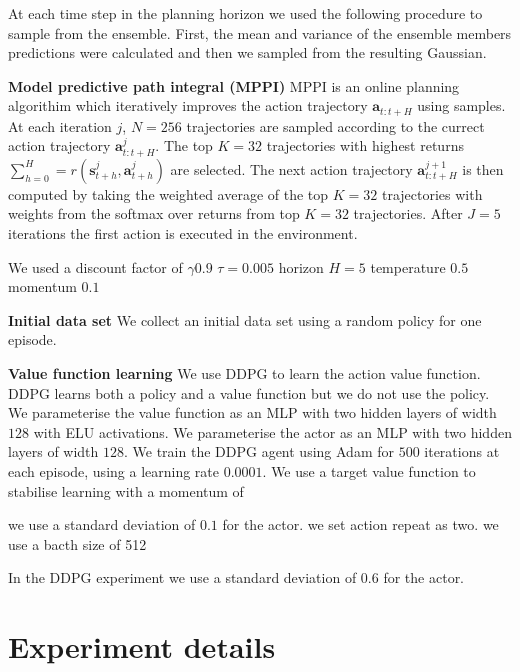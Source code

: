 \documentclass{article}
\newcommand{\state}{\ensuremath{\mathbf{s}}}
\newcommand{\action}{\ensuremath{\mathbf{a}}}
\begin{document}
At each time step in the planning horizon we used the following procedure to sample from the ensemble.
First, the mean and variance of the ensemble members predictions were calculated and then we
sampled from the resulting Gaussian.


\textbf{Model predictive path integral (MPPI)}
MPPI is an online planning algorithim which iteratively improves the action trajectory $\action_{t:t+H}$ using samples.
At each iteration $j$, $N=256$ trajectories are sampled according to the currect action trajectory $\action^{j}_{t:t+H}$.
The top $K=32$ trajectories with highest returns $\sum_{h=0}^{H} = r(\state^{j}_{t+h}, \action^{j}_{t+h})$ are selected.
The next action trajectory $\action^{j+1}_{t:t+H}$ is then computed by taking the weighted average of the top $K=32$ trajectories
with weights from the softmax over returns from top $K=32$ trajectories.
After $J=5$ iterations the first action is executed in the environment.

We used a discount factor of $\gamma 0.9$
$\tau=0.005$
horizon $H=5$
temperature $0.5$
momentum $0.1$

\textbf{Initial data set}
We collect an initial data set using a random policy for one episode.

\textbf{Value function learning}
We use DDPG to learn the action value function.
DDPG learns both a policy and a value function but we do not use the policy.
We parameterise the value function as an MLP with two hidden layers of width $128$ with ELU activations.
We parameterise the actor as an MLP with two hidden layers of width $128$.
We train the DDPG agent using Adam for $500$ iterations at each episode, using a learning rate $0.0001$.
We use a target value function to stabilise learning with a momentum of

 we use a standard deviation of $0.1$ for the actor.
we set action repeat as two.
we use a bacth size of 512

 In the DDPG experiment we use a standard deviation of $0.6$ for the actor.


\section{Experiment details}
\label{app:experiments}
\end{document}
